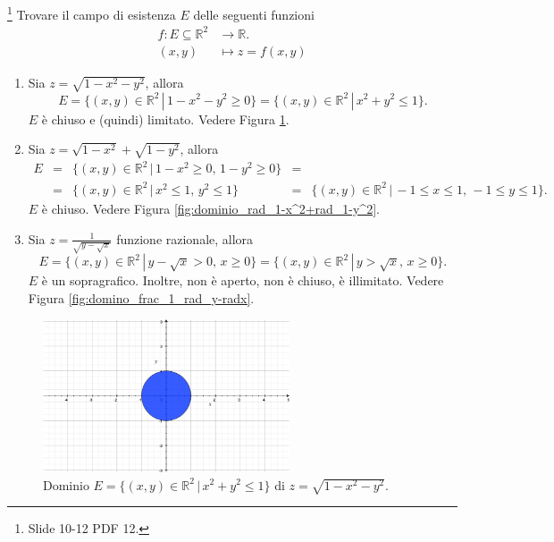 \begin{example}\footnote{Slide 10-12 PDF 12.}
    Trovare il campo di esistenza $E$ delle seguenti funzioni
    \begin{equation*}
        \begin{aligned}
            f\colon E\subseteq\mathbb R^2 &\rightarrow \mathbb R.\\
            (x,y)&\mapsto z=f(x,y)
        \end{aligned}
    \end{equation*}
    \begin{enumerate}
        \item Sia $z=\sqrt{1-x^2-y^2}$, allora
        \begin{equation*}
            E=\{(x,y)\in\mathbb R^2\,|\, 1-x^2-y^2\geq 0\}=\{(x,y)\in\mathbb R^2\,|\, x^2+y^2\leq 1\}.
        \end{equation*}
        $E$ è chiuso e (quindi) limitato. Vedere Figura \ref{fig:dominio_rad_1-x^2-y^2}.
        \item Sia $z=\sqrt{1-x^2}+\sqrt{1-y^2}$, allora
        \begin{equation*}
            \begin{matrix}
                E&=&\{(x,y)\in\mathbb R^2\,|\, 1-x^2\geq 0,\, 1-y^2\geq 0\}&=&\\
                &=&\{(x,y)\in\mathbb R^2\,|\, x^2\leq 1,\, y^2\leq 1\}&=&\{(x,y)\in\mathbb R^2\,|\, -1\leq x\leq 1,\, -1\leq y\leq 1\}.
            \end{matrix}
        \end{equation*}
        $E$ è chiuso. Vedere Figura \ref{fig:dominio_rad_1-x^2+rad_1-y^2}.
        \item Sia $z=\frac{1}{\sqrt{y-\sqrt{x}}}$ funzione razionale, allora
        \begin{equation*}
            E=\{(x,y)\in\mathbb R^2\,|\, y-\sqrt{x}>0,\, x\geq 0\}=\{(x,y)\in\mathbb R^2\,|\, y>\sqrt{x},\, x\geq 0\}.
        \end{equation*}
        $E$ è un sopragrafico. Inoltre, non è aperto, non è chiuso, è illimitato. Vedere Figura \ref{fig:domino_frac_1_rad_y-radx}.
    \end{enumerate}
    \begin{figure}
    \centering
    \includegraphics[width=0.65\textwidth]{Analisi2/figures/dominio_rad_1-x^2-y^2.jpg}
        \caption{Dominio $E=\{(x,y)\in\mathbb R^2\,|\, x^2+y^2\leq 1\}$ di $z=\sqrt{1-x^2-y^2}$.}\label{fig:dominio_rad_1-x^2-y^2}
    \end{figure}
    

\end{example}
